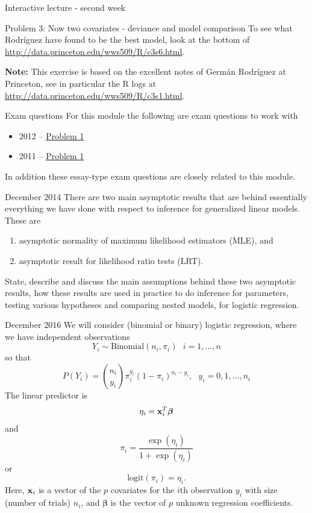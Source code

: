 \documentclass[
  ignorenonframetext,
]{beamer}
\providecommand{\tightlist}{%
  \setlength{\itemsep}{0pt}\setlength{\parskip}{0pt}}
\begin{document}
\begin{frame}[fragile]{Interactive lecture - second week}
\begin{block}{Problem 3: Now two covariates - deviance and model
comparison}
To see what Rodríguez have found to be the best model, look at the
bottom of \url{http://data.princeton.edu/wws509/R/c3s6.html}.

\textbf{Note:} This exercise is based on the excellent notes of Germán
Rodríguez at Princeton, see in particular the R logs at
\url{http://data.princeton.edu/wws509/R/c3s1.html}.
\end{block}
\end{frame}

\begin{frame}{Exam questions}
\protect\hypertarget{exam-questions}{}
For this module the following are exam questions to work with

\begin{itemize}
\tightlist
\item
  2012 --
  \href{https://www.math.ntnu.no/emner/TMA4315/Exam/GLMeksamen2012E.pdf}{Problem
  1}
\item
  2011 --
  \href{https://www.math.ntnu.no/emner/TMA4315/Exam/eksDes11e.pdf}{Problem
  1}
\end{itemize}

In addition these essay-type exam questions are closely related to this
module.

\begin{block}{December 2014}
\protect\hypertarget{december-2014}{}
There are two main asymptotic results that are behind essentially
everything we have done with respect to inference for generalized linear
models. These are

\begin{enumerate}
\item
  asymptotic normality of maximum likelihood estimators (MLE), and
\item
  asymptotic result for likelihood ratio tests (LRT).
\end{enumerate}

State, describe and discuss the main assumptions behind these two
asymptotic results, how these results are used in practice to do
inference for parameters, testing various hypotheses and comparing
nested models, for logistic regression.
\end{block}

\begin{block}{December 2016}
\protect\hypertarget{december-2016}{}
We will consider (binomial or binary) logistic regression, where we have
independent observations
\[Y_i \sim \text{Binomial}(n_i,\pi_i) \text{ } i=1,\ldots,n\] so that
\[P(Y_i)=\binom{n_i}{y_i}\pi_i^{y_i}(1-\pi_i)^{n_i-y_i}, \text{ } y_i=0,1,\ldots, n_i\]
The linear predictor is \[ \eta_i={\bf x}_i^T\boldsymbol{\beta}\] and
\[ \pi_i=\frac{\exp(\eta_i)}{1+\exp(\eta_i)}\] or
\[ \text{logit}(\pi_i)=\eta_i.\] Here, \({\bf x}_i\) is a vector of the
\(p\) covariates for the \(i\)th observation \(y_i\) with size (number
of trials) \(n_i\), and \(\boldsymbol{\beta}\) is the vector of \(p\)
unknown regression coefficients.


\end{block}
\end{frame}
\end{document}
